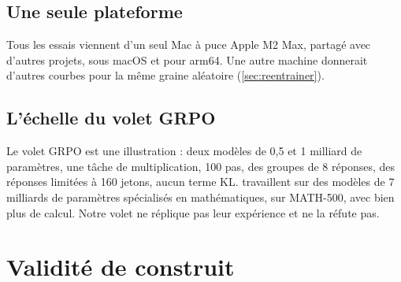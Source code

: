 \subsection{Une seule plateforme}

Tous les essais viennent d'un seul Mac à puce Apple M2 Max, partagé avec d'autres projets, sous
macOS et pour arm64. Une autre machine donnerait d'autres courbes pour la même graine aléatoire
(\cref{sec:reentrainer}).

\subsection{L'échelle du volet GRPO}

Le volet GRPO est une illustration : deux modèles de 0,5 et 1 milliard de paramètres, une tâche de
multiplication, 100 pas, des groupes de 8 réponses, des réponses limitées à 160 jetons, aucun terme
KL. \textcite{shao2025spurious} travaillent sur des modèles de 7 milliards de paramètres spécialisés
en mathématiques, sur MATH-500, avec bien plus de calcul. Notre volet ne réplique pas leur
expérience et ne la réfute pas.

\section{Validité de construit}
\label{sec:val-construit}

